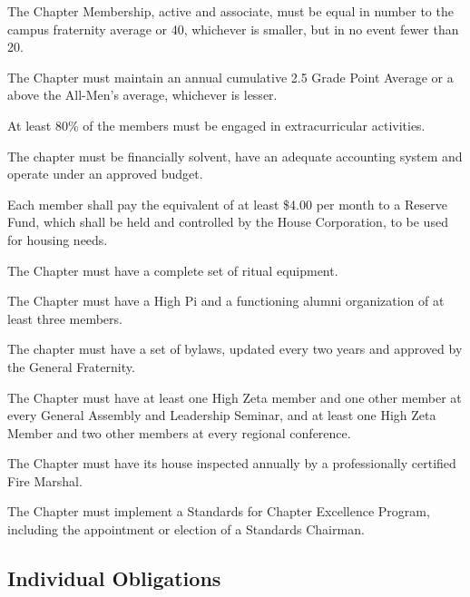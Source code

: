 \documentclass{article}
\begin{document}
\begin{subsubsectionList}
  \item The Chapter Membership, active and associate, must be equal in number to
  the campus fraternity average or 40, whichever is smaller, but in no event
  fewer than 20.

  \item The Chapter must maintain an annual cumulative 2.5 Grade Point Average
  or a  above the All-Men’s average, whichever is lesser.

  \item At least 80\% of the members must be engaged in extracurricular
  activities.

  \item The chapter must be financially solvent, have an adequate accounting
  system and operate under an approved budget.

  \item Each member shall pay the equivalent of at least \$4.00 per month to a
  Reserve Fund, which shall be held and controlled by the House Corporation, to
  be used for housing needs.

  \item The Chapter must have a complete set of ritual equipment.

  \item The Chapter must have a High Pi and a functioning alumni organization of
  at least three members.

  \item The chapter must have a set of bylaws, updated every two years and
  approved by the General Fraternity.

  \item The Chapter must have at least one High Zeta member and one other member
  at every General Assembly and Leadership Seminar, and at least one High Zeta
  Member and two other members at every regional conference.

  \item The Chapter must have its house inspected annually by a professionally
  certified Fire Marshal.

  \item The Chapter must implement a Standards for Chapter Excellence Program,
  including the appointment or election of a Standards Chairman.
\end{subsubsectionList}

\subsection{Individual Obligations}
\end{document}
